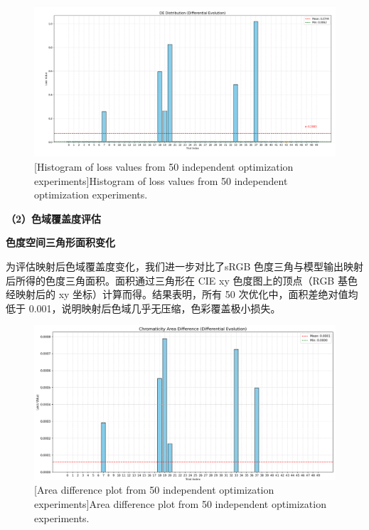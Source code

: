 \begin{figure}[h]
\centering
{}
\includegraphics[width=1.0\columnwidth]{figures/DE2000.png}
[Histogram of loss values from 50 independent optimization experiments]{Histogram of loss values from 50 independent optimization experiments.}
\label{figure3: 柱状loss}
\end{figure}

\noindent\textbf{（2）色域覆盖度评估}

 \textbf{色度空间三角形面积变化}

为评估映射后色域覆盖度变化，我们进一步对比了sRGB 色度三角与模型输出映射后所得的色度三角面积。面积通过三角形在 CIE xy 色度图上的顶点（RGB 基色经映射后的 xy 坐标）计算而得。结果表明，所有 50 次优化中，面积差绝对值均低于 0.001，说明映射后色域几乎无压缩，色彩覆盖极小损失。

\begin{figure}[h]
\centering
{}
\includegraphics[width=0.8\columnwidth]{figures/面积Loss.png}
[Area difference plot from 50 independent optimization experiments]{Area difference plot from 50 independent optimization experiments.}
\label{figure3: 面积diff}
\end{figure}

